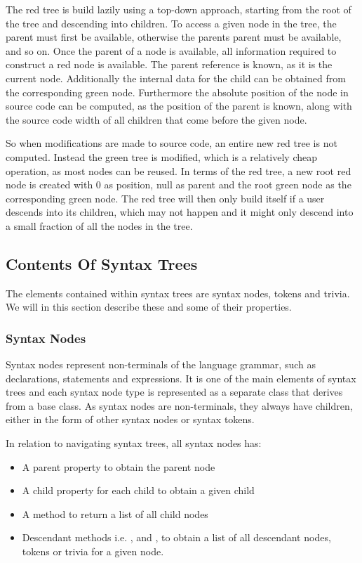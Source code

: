 The red tree is build lazily using a top-down approach, starting from the root of the tree and descending into children. To access a given node in the tree, the parent must first be available, otherwise the parents parent must be available, and so on. Once the parent of a node is available, all information required to construct a red node is available. The parent reference is known, as it is the current node. Additionally the internal data for the child can be obtained from the corresponding green node. Furthermore the absolute position of the node in source code can be computed, as the position of the parent is known, along with the source code width of all children that come before the given node\cite{sadovRoslynPerf}.

So when modifications are made to source code, an entire new red tree is not computed. Instead the green tree is modified, which is a relatively cheap operation, as most nodes can be reused. In terms of the red tree, a new root red node is created with 0 as position, null as parent and the root green node as the corresponding green node. The red tree will then only build itself if a user descends into its children, which may not happen and it might only descend into a small fraction of all the nodes in the tree\cite{sadovRoslynPerf}. %

\subsection{Contents Of Syntax Trees}
The elements contained within syntax trees are syntax nodes, tokens and trivia. We will in this section describe these and some of their properties.

\subsubsection{Syntax Nodes}
Syntax nodes represent non-terminals of the language grammar, such as declarations, statements and expressions. It is one of the main elements of syntax trees and each syntax node type is represented as a separate class that derives from a base  class. As syntax nodes are non-terminals, they always have children, either in the form of other syntax nodes or syntax tokens. 

In relation to navigating syntax trees, all syntax nodes has\cite[p. 7]{ng2012roslyn}:
\begin{itemize}
\item A parent property to obtain the parent node
\item A child property for each child to obtain a given child
\item A  method to return a list of all child nodes
\item Descendant methods i.e. ,  and , to obtain a list of all descendant nodes, tokens or trivia for a given node.
\end{itemize}

